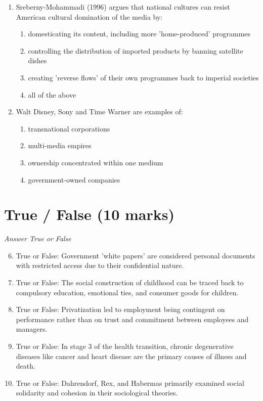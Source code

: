 \documentclass[12pt]{article}
\begin{document}
\begin{enumerate}[label=\arabic*.]
\begin{enumerate}[label=(\alph*)]
\end{enumerate}
\item Sreberny-Mohammadi (1996) argues that national cultures can resist American cultural domination of the media by:
\begin{enumerate}[label=(\alph*)]
    \item domesticating its content, including more 'home-produced' programmes
    \item controlling the distribution of imported products by banning satellite dishes
    \item creating 'reverse flows' of their own programmes back to imperial societies
    \item all of the above
\end{enumerate}
\item Walt Disney, Sony and Time Warner are examples of:
\begin{enumerate}[label=(\alph*)]
    \item transnational corporations
    \item multi-media empires
    \item ownership concentrated within one medium
    \item government-owned companies
\end{enumerate}
\end{enumerate}

\section*{True / False (10 marks)}
\textit{Answer True or False}
\begin{enumerate}[label=\arabic*.]
\setcounter{enumi}{5}
\item True or False: Government 'white papers' are considered personal documents with restricted access due to their confidential nature.
\item True or False: The social construction of childhood can be traced back to compulsory education, emotional ties, and consumer goods for children.
\item True or False: Privatization led to employment being contingent on performance rather than on trust and commitment between employees and managers.
\item True or False: In stage 3 of the health transition, chronic degenerative diseases like cancer and heart disease are the primary causes of illness and death.
\item True or False: Dahrendorf, Rex, and Habermas primarily examined social solidarity and cohesion in their sociological theories.
\end{enumerate}
\end{document}
